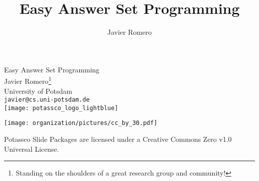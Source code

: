 \title{Easy Answer Set Programming}
\author{Javier Romero}
\begin{frame}[c]
  \bigskip
  \vfill
  \begin{center}%
    \alert{\huge Easy Answer Set Programming}
    \bigskip
    \bigskip
    \\ 
    Javier Romero\footnote{Standing on the shoulders of a great research group and community!}\\
    University of Potsdam\\
    \texttt{javier@cs.uni-potsdam.de}\\
    \bigskip
    \texttt{[image: potassco\_logo\_lightblue]}
  \end{center}
  \bigskip
  \begin{center}
    \texttt{[image: organization/pictures/cc\_by\_30.pdf]} %
    \par
    {\tiny Potassco Slide Packages are licensed under a Creative Commons Zero v1.0 Universal License.}
  \end{center}
\end{frame}
%
